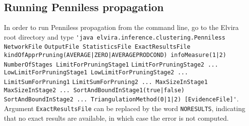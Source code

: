 \begin{itemize}
  \subsection{Running Penniless propagation}
  
  In order to run Penniless propagation from the command line, go
  to the Elvira root directory and type
  \verb"'java elvira.inference.clustering.Penniless NetworkFile"
  \verb"OutputFile StatisticsFile ExactResultsFile"
  \verb"kindOfApprPruning(AVERAGE|ZERO|AVERAGEPRODCOND) infoMeasure(1|2) NumberOfStages LimitForPruningStage1"
  \verb"LimitForPruningStage2 ... LowLimitForPruningStage1 LowLimitForPruningStage2 ... LimitSumForPruning1"
  \verb"LimitSumForPruning2 ... MaxSizeInStage1 MaxSizeInStage2 ... SortAndBoundInStage1(true|false)"
  \verb"SortAndBoundInStage2 ... TriangulationMethod(0|1|2) [EvidenceFile]'". Argument \verb"ExactResultsFile" can be
  replaced by the word \verb"NORESULTS", indicating that no
  exact results are available, in which case the error is not
  computed.
  
\end{itemize}
